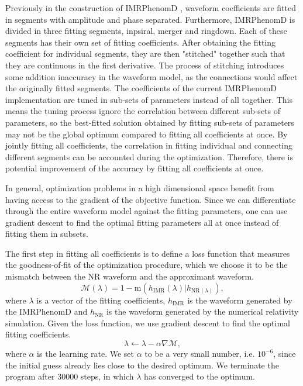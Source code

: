 \documentclass[twocolumn]{aastex631}
\begin{document}
Previously in the construction of IMRPhenomD \citep{Khan:2015jqa}, waveform
coefficients are fitted in segments with amplitude and phase separated.
Furthermore, IMRPhenomD is divided in three fitting segments, inpsiral, merger and ringdown.
Each of these segments has their own set of fitting coefficients.
After obtaining the fitting coefficient for individual segments, they are then
"stitched" together such that they are continuous in the first derivative.
The process of stitching introduces some addition
inaccuracy in the waveform model, as the connections would affect the originally
fitted segments.
The coefficients of the current IMRPhenomD implementation are tuned in sub-sets
of parameters instead of all together. This means the tuning process ignore the
correlation between different sub-sets of parameters, so the best-fitted
solution obtained by fitting sub-sets of parameters may not be the global
optimum compared to fitting all coefficients at once. By jointly
fitting all coefficients, the correlation in fitting individual and connecting
different segments can be accounted during the optimization. Therefore, there is
potential improvement of the accuracy by fitting all coefficients at once.

In general, optimization problems in a high dimensional space benefit from
having access to the gradient of the objective function. Since we can
differentiate through the entire waveform model against the fitting parameters,
one can use gradient descent to find the optimal fitting parameters all at once
instead of fitting them in subsets.




The first step in fitting all coefficients is to define a loss function that
measures the goodness-of-fit of the optimization procedure, which we choose it
to be the mismatch between the NR waveform and the approximant waveform.
\begin{equation}
    \label{eq:mismatch}
	\mathcal{M}(\lambda)=1-\mathrm{m}(h_{\mathrm{IMR}}(\lambda)|h_{\mathrm{NR}(\lambda)}),
\end{equation}
where $\lambda$ is a vector of the fitting coefficients, $h_{\mathrm{IMR}}$ is
the waveform generated by the IMRPhenomD and $h_{\mathrm{NR}}$ is the waveform
generated by the numerical relativity simulation. 
Given the loss function, we use gradient descent to find the optimal fitting
coefficients.
\begin{equation}
	\lambda\leftarrow\lambda-\alpha\nabla\mathcal{M}, 
\end{equation}
where $\alpha$ is the learning rate. We set $\alpha$ to be a very small number, i.e. $10^{-6}$, since the initial guess already lies close to the desired optimum. We terminate the program after 30000 steps, in which $\lambda$ has converged to the optimum. 
\end{document}
